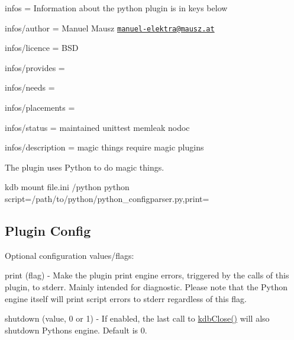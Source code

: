 
\begin{DoxyItemize}
\item infos = Information about the python plugin is in keys below
\item infos/author = Manuel Mausz \href{mailto:manuel-elektra@mausz.at}{\tt manuel-\/elektra@mausz.\+at}
\item infos/licence = B\+S\+D
\item infos/provides =
\item infos/needs =
\item infos/placements =
\item infos/status = maintained unittest memleak nodoc
\item infos/description = magic things require magic plugins
\end{DoxyItemize}

The plugin uses Python to do magic things.

\begin{DoxyVerb}kdb mount file.ini /python python script=/path/to/python/python_configparser.py,print=
\end{DoxyVerb}


\subsection*{Plugin Config}

Optional configuration values/flags\+:
\begin{DoxyItemize}
\item print (flag) -\/ Make the plugin print engine errors, triggered by the calls of this plugin, to stderr. Mainly intended for diagnostic. Please note that the Python engine itself will print script errors to stderr regardless of this flag.
\item shutdown (value, 0 or 1) -\/ If enabled, the last call to {\ttfamily \hyperlink{group__kdb_gadb54dc9fda17ee07deb9444df745c96f}{kdb\+Close()}} will also shutdown Pythons engine. Default is 0. 
\end{DoxyItemize}